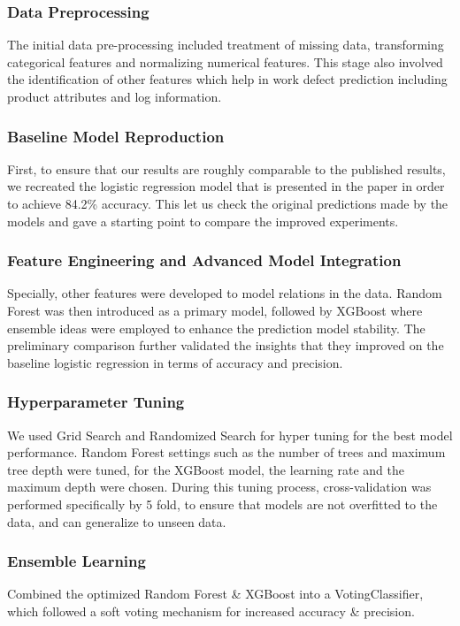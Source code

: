 \documentclass[conference]{IEEEtran}
\begin{document}
\subsubsection{Data Preprocessing}
The initial data pre-processing included treatment of missing data, transforming categorical features and normalizing numerical features. This stage also involved the identification of other features which help in work defect prediction including product attributes and log information.

\subsubsection{Baseline Model Reproduction}
First, to ensure that our results are roughly comparable to the published results, we recreated the logistic regression model that is presented in the paper in order to achieve 84.2\% accuracy. This let us check the original predictions made by the models and gave a starting point to compare the improved experiments.
 
\subsubsection{Feature Engineering and Advanced Model Integration}
Specially, other features were developed to model relations in the data. Random Forest was then introduced as a primary model, followed by XGBoost where ensemble ideas were employed to enhance the prediction model stability. The preliminary comparison further validated the insights that they improved on the baseline logistic regression in terms of accuracy and precision.

\subsubsection{Hyperparameter Tuning}
We used Grid Search and Randomized Search for hyper tuning for the best model performance. Random Forest settings such as the number of trees and maximum tree depth were tuned, for the XGBoost model, the learning rate and the maximum depth were chosen. During this tuning process, cross-validation was performed specifically by 5 fold, to ensure that models are not overfitted to the data, and can generalize to unseen data.

\subsubsection{Ensemble Learning}
Combined the optimized Random Forest \& XGBoost into a VotingClassifier, which followed a soft voting mechanism for increased accuracy \& precision.
\end{document}
